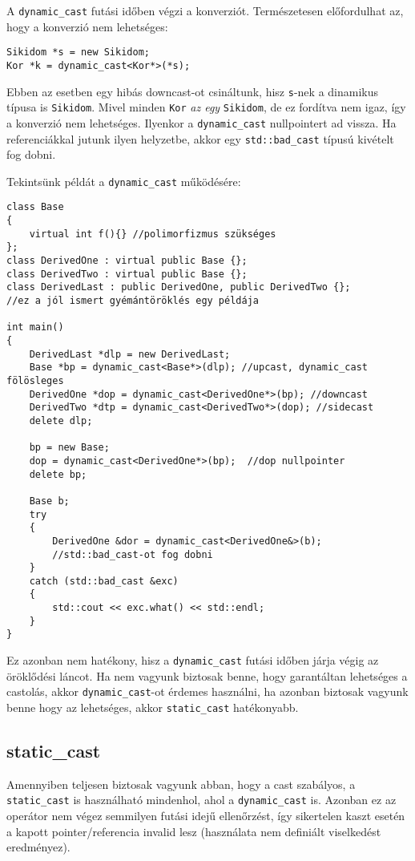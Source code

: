 \documentclass[a4paper,11.5pt,table]{article}
\begin{document}
	A \texttt{dynamic\_cast} futási időben végzi a konverziót. Természetesen előfordulhat az, hogy a konverzió nem lehetséges:
	\begin{lstlisting}
Sikidom *s = new Sikidom;
Kor *k = dynamic_cast<Kor*>(*s);
	\end{lstlisting}
	Ebben az esetben egy hibás downcast-ot csináltunk, hisz \texttt{s}-nek a dinamikus típusa is \texttt{Sikidom}. Mivel minden \texttt{Kor} \textit{az egy} \texttt{Sikidom}, de ez fordítva nem igaz, így a konverzió nem lehetséges. Ilyenkor a \texttt{dynamic\_cast} nullpointert ad vissza. Ha referenciákkal jutunk ilyen helyzetbe, akkor egy \texttt{std::bad\_cast} típusú kivételt fog dobni.
	
	\smallskip
	Tekintsünk példát a \texttt{dynamic\_cast} működésére:
	\begin{lstlisting}
class Base 
{
	virtual int f(){} //polimorfizmus szükséges
};
class DerivedOne : virtual public Base {};
class DerivedTwo : virtual public Base {};
class DerivedLast : public DerivedOne, public DerivedTwo {};
//ez a jól ismert gyémántöröklés egy példája

int main()
{
	DerivedLast *dlp = new DerivedLast;
	Base *bp = dynamic_cast<Base*>(dlp); //upcast, dynamic_cast fölösleges
	DerivedOne *dop = dynamic_cast<DerivedOne*>(bp); //downcast
	DerivedTwo *dtp = dynamic_cast<DerivedTwo*>(dop); //sidecast
	delete dlp;
	
	bp = new Base;
	dop = dynamic_cast<DerivedOne*>(bp);  //dop nullpointer
	delete bp;
	
	Base b;
	try
	{
		DerivedOne &dor = dynamic_cast<DerivedOne&>(b); 
		//std::bad_cast-ot fog dobni
	}
	catch (std::bad_cast &exc)
	{
		std::cout << exc.what() << std::endl;
	}
}
	\end{lstlisting}
	
	Ez azonban nem hatékony, hisz a \texttt{dynamic\_cast} futási időben járja végig az öröklődési láncot. Ha nem vagyunk biztosak benne, hogy garantáltan lehetséges a castolás, akkor \texttt{dynamic\_cast}-ot érdemes használni, ha azonban biztosak vagyunk benne hogy az lehetséges, akkor \texttt{static\_cast} hatékonyabb.
	\subsection{static\_cast}
	Amennyiben teljesen biztosak vagyunk abban, hogy a cast szabályos, a \texttt{static\_cast} is használható mindenhol, ahol a \texttt{dynamic\_cast} is. Azonban ez az operátor nem végez semmilyen futási idejű ellenőrzést, így sikertelen kaszt esetén a kapott pointer/referencia invalid lesz (használata nem definiált viselkedést eredményez).
	
\end{document}
